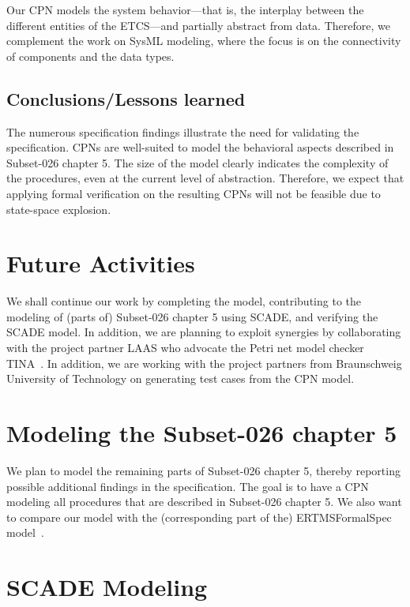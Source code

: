 Our CPN models the system behavior---that is, the interplay between the different entities of the ETCS---and partially abstract from data. Therefore, we complement the work on SysML modeling, where the focus is on the connectivity of components and the data types.
 
\subsection{Conclusions/Lessons learned}
 
The numerous specification findings illustrate the need for validating the specification. CPNs are well-suited to model the behavioral aspects described in Subset-026 chapter 5. The size of the model clearly indicates the complexity of the procedures, even at the current level of abstraction. Therefore, we expect that applying formal verification on the resulting CPNs will not be feasible due to state-space explosion.

\section{Future Activities}


We shall continue our work by completing the model, contributing to the modeling of (parts of) Subset-026 chapter 5 using SCADE, and verifying the SCADE model. In addition, we are planning to exploit synergies by collaborating with the project partner LAAS who advocate the Petri net model checker TINA~\cite{BerthomieuV2006}. In addition, we are working with the project partners from Braunschweig University of Technology on generating test cases from the CPN model.


\section{Modeling the Subset-026 chapter 5}

We plan to model the remaining parts of Subset-026 chapter 5, thereby reporting possible additional findings in the specification. The goal is to have a CPN modeling all procedures that are described in Subset-026 chapter 5. We also want to compare our model with the (corresponding part of the) ERTMSFormalSpec model~\cite{ertms}.


\section{SCADE Modeling}


